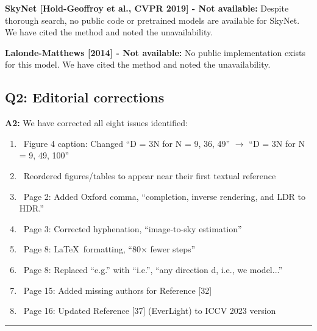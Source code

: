 \documentclass[11pt]{article}
\newcommand{\question}[1]{\subsection*{Q#1}}
\newcommand{\answer}[1]{\textbf{A#1:}}
\begin{document}
\textbf{SkyNet [Hold-Geoffroy et al., CVPR 2019] - Not available:}
Despite thorough search, no public code or pretrained models are available for SkyNet. We have cited the method and noted the unavailability.

\textbf{Lalonde-Matthews [2014] - Not available:}
No public implementation exists for this model. We have cited the method and noted the unavailability.

\question{2: Editorial corrections}

\answer{2} We have corrected all eight issues identified:

\begin{enumerate}
    \item ~Figure 4 caption: Changed ``D = 3N for N = 9, 36, 49'' $\rightarrow$ ``D = 3N for N = 9, 49, 100''
    \item ~Reordered figures/tables to appear near their first textual reference
    \item ~Page 2: Added Oxford comma, ``completion, inverse rendering, and LDR to HDR.''
    \item ~Page 3: Corrected hyphenation, ``image-to-sky estimation''
    \item ~Page 8: \LaTeX\ formatting, ``80$\times$ fewer steps''
    \item ~Page 8: Replaced ``e.g.'' with ``i.e.'', ``any direction d, i.e., we model...''
    \item ~Page 15: Added missing authors for Reference [32]
    \item ~Page 16: Updated Reference [37] (EverLight) to ICCV 2023 version
\end{enumerate}

\vspace{1em}
\hrule
\vspace{1em}
\end{document}
